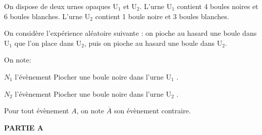 \medskip

On dispose de deux urnes opaques U$_1$ et U$_2$.
L'urne U$_1$ contient 4 boules noires et 6 boules blanches.
L'urne U$_2$ contient 1 boule noire et 3 boules blanches.

On considère l'expérience aléatoire suivante :
on pioche au hasard une boule dans U$_1$ que l'on place dans U$_2$, puis on pioche au hasard une boule dans U$_2$.

\begin{list}{\textbullet}{On note:}
\item $N_1$ l'évènement \og Piocher une boule noire dans l'urne U$_1$ \fg.
\item $N_2$ l'évènement \og Piocher une boule noire dans l'urne U$_2$ \fg.
\end{list}

Pour tout évènement $A$, on note $\overline{A}$ son évènement contraire.

\bigskip

\textbf{PARTIE A}

\medskip

